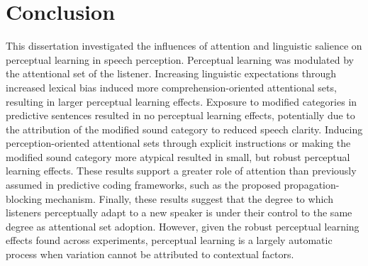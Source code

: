 \section{Conclusion}

This dissertation investigated the influences of attention and linguistic salience on perceptual learning in speech perception.
Perceptual learning was modulated by the attentional set of the listener.
Increasing linguistic expectations through increased lexical bias induced more comprehension-oriented attentional sets, resulting in larger perceptual learning effects.
Exposure to modified categories in predictive sentences resulted in no perceptual learning effects, potentially due to the attribution of the modified sound category to reduced speech clarity.
Inducing perception-oriented attentional sets through explicit instructions or making the modified sound category more atypical resulted in small, but robust perceptual learning effects.
These results support a greater role of attention than previously assumed in predictive coding frameworks, such as the proposed propagation-blocking mechanism.
Finally, these results suggest that the degree to which listeners perceptually adapt to a new speaker is under their control to the same degree as attentional set adoption.
However, given the robust perceptual learning effects found across experiments, perceptual learning is a largely automatic process when variation cannot be attributed to contextual factors.


